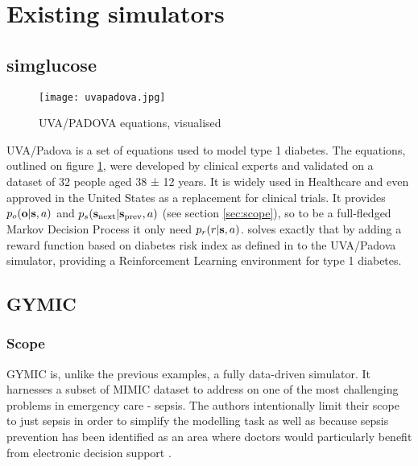 \section{Existing simulators}
\label{sec:existing}

\subsection{simglucose}
\label{sec:simglucose}

\begin{figure}
    \centering
    \texttt{[image: uvapadova.jpg]}
    \caption{UVA/PADOVA equations, visualised}
    \label{fig:uvapadova}
\end{figure}

UVA/Padova \cite{sim-diabetes-fda} is a set of equations used to model type 1 diabetes.
The equations, outlined on figure \ref{fig:uvapadova}, were developed by clinical experts and validated on a dataset of 32 people aged 38 ± 12 years.
It is widely used in Healthcare and even approved in the United States as a replacement for clinical trials.
It provides $p_o(\mathbf{o} | \textbf{s}, a)$ and $p_s(\textbf{s}_\text{next} | \textbf{s}_\text{prev}, a)$ (see section \ref{sec:scope}), so to be a full-fledged Markov Decision Process it only need $p_r(r|\textbf{s},a)$.
\cite{simglucose} solves exactly that by adding a reward function based on diabetes risk index as defined in \cite{diabetesrisk} to the UVA/Padova simulator, providing a Reinforcement Learning environment for type 1 diabetes.

\subsection{GYMIC}
\label{sec:gymic}

\subsubsection{Scope}
GYMIC \cite{gym-sepsis} is, unlike the previous examples, a fully data-driven simulator.
It harnesses a subset of MIMIC \cite{johnsonMIMICIVFreelyAccessible2023} dataset to address on one of the most challenging problems in emergency care - sepsis.
The authors intentionally limit their scope to just sepsis in order to simplify the modelling task as well as because sepsis prevention has been identified as an area where doctors would particularly benefit from electronic decision support \cite{sepsis-motivation1,sepsis-motivation2}.

